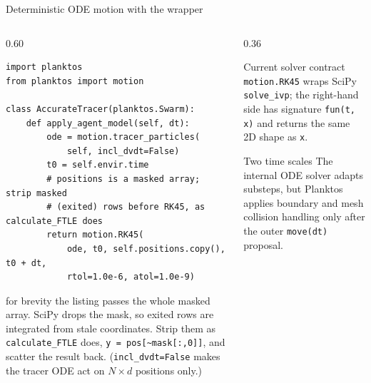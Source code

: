 \documentclass[aspectratio=169,11pt]{beamer}
\newcommand{\densecode}{\ttfamily\fontsize{7.2}{8.0}\selectfont}
\begin{document}
\begin{frame}[fragile]{Deterministic ODE motion with the  wrapper}
\begin{columns}[T,onlytextwidth]
\begin{column}{0.60\textwidth}
\begin{lstlisting}[basicstyle=\densecode]
import planktos
from planktos import motion

class AccurateTracer(planktos.Swarm):
    def apply_agent_model(self, dt):
        ode = motion.tracer_particles(
            self, incl_dvdt=False)
        t0 = self.envir.time
        # positions is a masked array; strip masked
        # (exited) rows before RK45, as calculate_FTLE does
        return motion.RK45(
            ode, t0, self.positions.copy(), t0 + dt,
            rtol=1.0e-6, atol=1.0e-9)
\end{lstlisting}
{\footnotesize{} for brevity the listing passes the whole masked array. SciPy drops the mask, so exited rows are integrated from stale coordinates. Strip them as \texttt{calculate\_FTLE} does, \texttt{y = pos[\textasciitilde mask[:,0]]}, and scatter the result back. (\texttt{incl\_dvdt=False} makes the tracer ODE act on \(N\times d\) positions only.)\par}
\end{column}
\begin{column}{0.36\textwidth}
\begin{block}{Current solver contract}
\texttt{motion.RK45} wraps SciPy \texttt{solve\_ivp}; the right-hand side has signature \texttt{fun(t, x)} and returns the same 2D shape as \texttt{x}.
\end{block}
\begin{alertblock}{Two time scales}
The internal ODE solver adapts substeps, but Planktos applies boundary and mesh collision handling only after the outer \texttt{move(dt)} proposal.
\end{alertblock}
\end{column}
\end{columns}
\end{frame}
\end{document}
